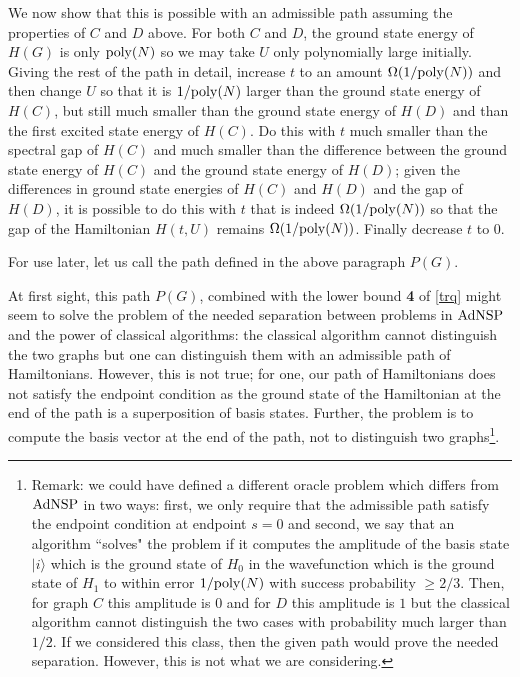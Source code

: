 \documentclass[letterpaper,onecolumn]{quantumarticle}
\newcommand{\poly}{{\rm poly}}
\newcommand{\Ocl}{{\rm AdNSP}}
\begin{document}
We now show that this is possible with an admissible path assuming the properties of $C$ and $D$ above.
For both $C$ and $D$, the ground state energy of $H(G)$ is only $\poly(N)$ so we may take $U$ only polynomially large initially. 
Giving the rest of the path in detail,
increase $t$ to an amount $\Omega(1/\poly(N))$ and then change $U$ so that it is $1/\poly(N)$ larger than the ground state energy of $H(C)$, but still much smaller than the ground state energy of $H(D)$ and than the first excited state energy of $H(C)$.  Do this with $t$ much smaller than the spectral gap of $H(C)$ and much smaller than the difference between the ground state energy of
$H(C)$ and the ground state energy of $H(D)$; given the differences in ground state energies of $H(C)$ and $H(D)$ and the gap of $H(D)$, it is possible to do this with $t$ that is indeed $\Omega(1/\poly(N))$ so that the gap of the Hamiltonian $H(t,U)$ remains $\Omega(1/\poly(N))$.  Finally decrease $t$ to $0$.

For use later, let us call the path defined in the above paragraph $P(G)$.

At first sight, this path $P(G)$, combined with the lower bound {\bf 4} of \cref{trq} might seem to solve the problem of the needed separation between problems in $\Ocl$ and the power of classical algorithms: the classical algorithm cannot distinguish the two graphs but one can distinguish them with an admissible path of Hamiltonians.  However, this is not true; for one, our path of Hamiltonians does not satisfy the endpoint condition as the ground state of the Hamiltonian at the end of the path is a superposition of basis states.  Further, the problem is to compute the basis vector at the end of the path, not to distinguish two graphs\footnote{Remark: we could have defined a different oracle problem which differs from $\Ocl$ in two ways: first, we only require that the admissible path satisfy the endpoint condition at endpoint $s=0$ and second, we say that an algorithm ``solves" the problem if it computes the amplitude of the basis state $|i\rangle$ which is the ground state of $H_0$ in the wavefunction which is the ground state of $H_1$ to within error $1/\poly(N)$ with success probability $\geq 2/3$.  Then, for graph $C$ this amplitude is $0$ and for $D$ this amplitude is $1$ but the classical algorithm cannot distinguish the two cases with probability much larger than $1/2$.  If we considered this class, then the given path would prove the needed separation.  However, this is not what we are considering.}.
\end{document}
